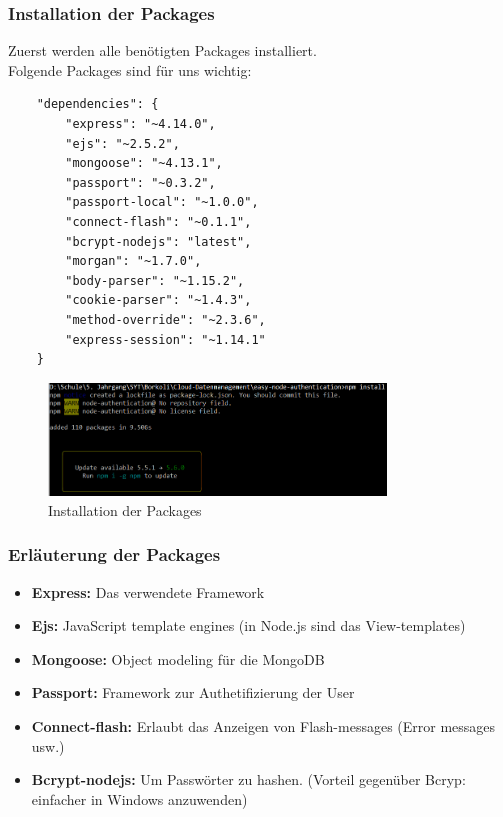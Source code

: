 \clearpage

\subsubsection{Installation der Packages}
Zuerst werden alle benötigten Packages installiert. \\
Folgende Packages sind für uns wichtig:
\begin{lstlisting}
	"dependencies": {
		"express": "~4.14.0",
		"ejs": "~2.5.2",
		"mongoose": "~4.13.1",
		"passport": "~0.3.2",
		"passport-local": "~1.0.0",
		"connect-flash": "~0.1.1",
		"bcrypt-nodejs": "latest",
		"morgan": "~1.7.0",
		"body-parser": "~1.15.2",
		"cookie-parser": "~1.4.3",
		"method-override": "~2.3.6",
		"express-session": "~1.14.1"
	}
\end{lstlisting}

\begin{figure}[!h] 
	\centering
	\includegraphics[width=0.8\textwidth]{images/npminstall.PNG}
	\caption{Installation der Packages}
	\label{fig:Installation der Packages}
\end{figure}

\subsubsection{Erläuterung der Packages}
\begin{itemize}
	\item \textbf{Express:} Das verwendete Framework
	\item \textbf{Ejs:} JavaScript template engines (in Node.js sind das View-templates)
	\item \textbf{Mongoose:} Object modeling für die MongoDB
	\item \textbf{Passport:} Framework zur Authetifizierung der User
	\item \textbf{Connect-flash:} Erlaubt das Anzeigen von Flash-messages (Error messages usw.)
	\item \textbf{Bcrypt-nodejs:} Um Passwörter zu hashen. (Vorteil gegenüber Bcryp: einfacher in Windows anzuwenden)
\end{itemize}
\clearpage
